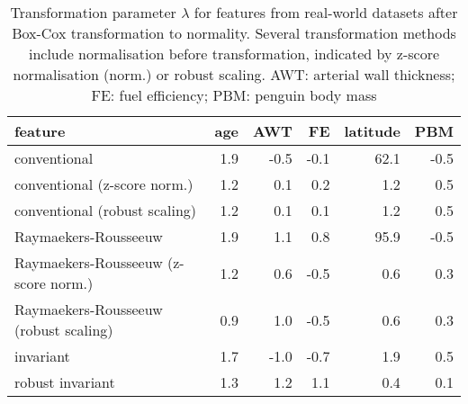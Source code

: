 \documentclass[
  a4paper,
]{article}
\begin{document}
\begin{table}
\begin{center}
\caption{Transformation parameter $\lambda$ for features from real-world datasets after Box-Cox transformation to normality. 
Several transformation methods include normalisation before transformation, indicated by z-score normalisation (norm.) or robust scaling. 
AWT: arterial wall thickness; FE: fuel efficiency; PBM: penguin body mass}
\label{tab:experimental-results-appendix-lambda-bc}
\begin{tabular}{l | r r r r r}

\toprule
feature & age & AWT & FE & latitude & PBM \\

\midrule

conventional                          & 1.9 & -0.5 & -0.1 & 62.1 & -0.5 \\
conventional (z-score norm.)          & 1.2 &  0.1 &  0.2 &  1.2 &  0.5 \\
conventional (robust scaling)         & 1.2 &  0.1 &  0.1 &  1.2 &  0.5 \\
Raymaekers-Rousseeuw                  & 1.9 &  1.1 &  0.8 & 95.9 & -0.5 \\
Raymaekers-Rousseeuw (z-score norm.)  & 1.2 &  0.6 & -0.5 &  0.6 &  0.3 \\
Raymaekers-Rousseeuw (robust scaling) & 0.9 &  1.0 & -0.5 &  0.6 &  0.3 \\
invariant                             & 1.7 & -1.0 & -0.7 &  1.9 &  0.5 \\
robust invariant                      & 1.3 &  1.2 &  1.1 &  0.4 &  0.1 \\

\bottomrule
\end{tabular}
\end{center}
\end{table}
\end{document}
